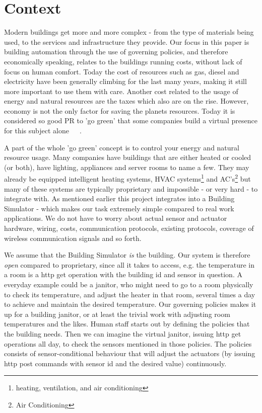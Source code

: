 \section{Context} \label{sec:context}
Modern buildings get more and more complex - from the type of materials being used, to the services and infrastructure they provide. Our focus in this paper is building automation through the use of governing policies, and therefore economically speaking, relates to the buildings running costs, without lack of focus on human comfort. Today the cost of resources such as gas, diesel and electricity have been generally climbing for the last many years, making it still more important to use them with care. Another cost related to the usage of energy and natural resources are the taxes which also are on the rise. However, economy is not the only factor for saving the planets resources. Today it is considered so good PR to 'go green' that some companies build a virtual presence for this subject alone~\cite{green-google}~\cite{green-facebook}~\cite{green-microsoft}.

A part of the whole 'go green' concept is to control your energy and natural resource usage. Many companies have buildings that are either heated or cooled (or both), have lighting, appliances and server rooms to name a few. They may already be equipped intelligent heating systems, HVAC systems\footnote{heating, ventilation, and air conditioning} and AC's\footnote{Air Conditioning} but many of these systems are typically proprietary and impossible - or very hard - to integrate with. As mentioned earlier this project integrates into a Building Simulator - which makes our task extremely simple compared to real work applications. We do not have to worry about actual sensor and actuator hardware, wiring, costs, communication protocols, existing protocols, coverage of wireless communication signals and so forth.

We assume that the Building Simulator \textit{is} the building. Our system is therefore \textit{open} compared to proprietary, since all it takes to access, e.g. the temperature in a room is a http get operation with the building id and sensor in question. A everyday example could be a janitor, who might need to go to a room physically to check its temperature, and adjust the heater in that room, several times a day to achieve and maintain the desired temperature. Our governing policies makes it up for a building janitor, or at least the trivial work with adjusting room temperatures and the likes. Human staff starts out by defining the policies that the building needs. Then we can imagine the virtual janitor, issuing http get operations all day, to check the sensors mentioned in those policies. The policies consists of sensor-conditional behaviour that will adjust the actuators (by issuing http post commands with sensor id and the desired value) continuously.

